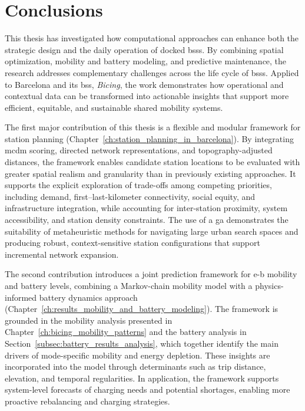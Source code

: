 \chapter{Conclusions}
\label{ch:conclusions}

This thesis has investigated how computational approaches can enhance both the strategic design and the daily operation of docked \acp{bss}. By combining spatial optimization, mobility and battery modeling, and predictive maintenance, the research addresses complementary challenges across the life cycle of \acp{bss}. Applied to Barcelona and its \ac{bss}, \textit{Bicing}, the work demonstrates how operational and contextual data can be transformed into actionable insights that support more efficient, equitable, and sustainable shared mobility systems.

The first major contribution of this thesis is a flexible and modular framework for station planning (Chapter~\ref{ch:station_planning_in_barcelona}). By integrating \ac{mcdm} scoring, directed network representations, and topography-adjusted distances, the framework enables candidate station locations to be evaluated with greater spatial realism and granularity than in previously existing approaches. It supports the explicit exploration of trade-offs among competing priorities, including demand, first--last-kilometer connectivity, social equity, and infrastructure integration, while accounting for inter-station proximity, system accessibility, and station density constraints. The use of a \ac{ga} demonstrates the suitability of metaheuristic methods for navigating large urban search spaces and producing robust, context-sensitive station configurations that support incremental network expansion.

The second contribution introduces a joint prediction framework for \ac{e-b} mobility and battery levels, combining a Markov-chain mobility model with a physics-informed battery dynamics approach (Chapter~\ref{ch:results_mobility_and_battery_modeling}). The framework is grounded in the mobility analysis presented in Chapter~\ref{ch:bicing_mobility_patterns} and the battery analysis in Section~\ref{subsec:battery_results_analysis}, which together identify the main drivers of mode-specific mobility and energy depletion. These insights are incorporated into the model through determinants such as trip distance, elevation, and temporal regularities. In application, the framework supports system-level forecasts of charging needs and potential shortages, enabling more proactive rebalancing and charging strategies.

